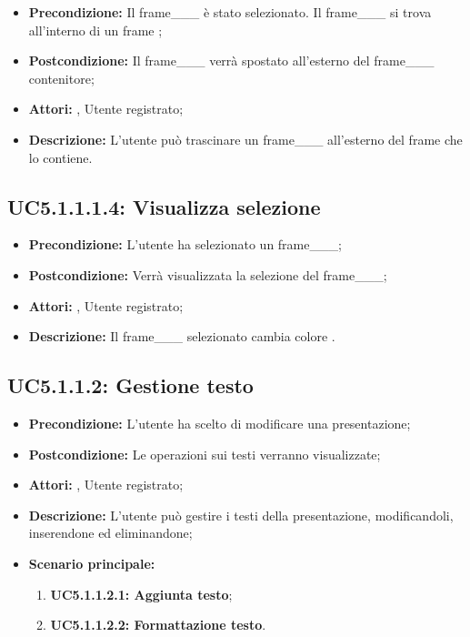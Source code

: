\begin{itemize}
	\item \textbf{Precondizione:} Il frame___ è stato selezionato. Il frame___ si trova all'interno di un frame ;
	\item \textbf{Postcondizione:} Il frame___ verrà spostato all'esterno del frame___ contenitore;
	\item \textbf{Attori:} , Utente registrato;
	\item \textbf{Descrizione:} L'utente può trascinare un frame___ all'esterno del frame che lo contiene.
\end{itemize}
\subsection{ UC5.1.1.1.4: Visualizza selezione}

\begin{itemize}
	\item \textbf{Precondizione:} L'utente ha selezionato un frame___;
	\item \textbf{Postcondizione:} Verrà visualizzata la selezione del frame___;
	\item \textbf{Attori:} , Utente registrato;
	\item \textbf{Descrizione:} Il frame___ selezionato cambia colore .
\end{itemize}
\subsection{ UC5.1.1.2: Gestione testo}

\begin{itemize}
	\item \textbf{Precondizione:} L'utente ha scelto di modificare una presentazione;
	\item \textbf{Postcondizione:} Le operazioni sui testi verranno visualizzate;
	\item \textbf{Attori:} , Utente registrato;
	\item \textbf{Descrizione:} L'utente può gestire i testi della presentazione, modificandoli, inserendone ed eliminandone;
	\item \textbf{Scenario principale:}
	\begin{enumerate}
		\item \textbf{ UC5.1.1.2.1: Aggiunta testo};
		\item \textbf{ UC5.1.1.2.2: Formattazione testo}.
	\end{enumerate}
\end{itemize}
